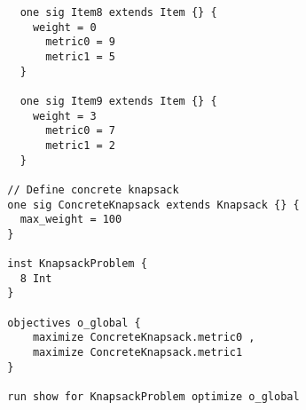 \begin{verbatim}
    one sig Item8 extends Item {} {
      weight = 0      
        metric0 = 9       
        metric1 = 5      
    }

    one sig Item9 extends Item {} {
      weight = 3      
        metric0 = 7       
        metric1 = 2  
    }

  // Define concrete knapsack
  one sig ConcreteKnapsack extends Knapsack {} {
    max_weight = 100
  }

  inst KnapsackProblem {
    8 Int
  }

  objectives o_global {    
      maximize ConcreteKnapsack.metric0 ,
      maximize ConcreteKnapsack.metric1     
  }

  run show for KnapsackProblem optimize o_global

\end{verbatim}
